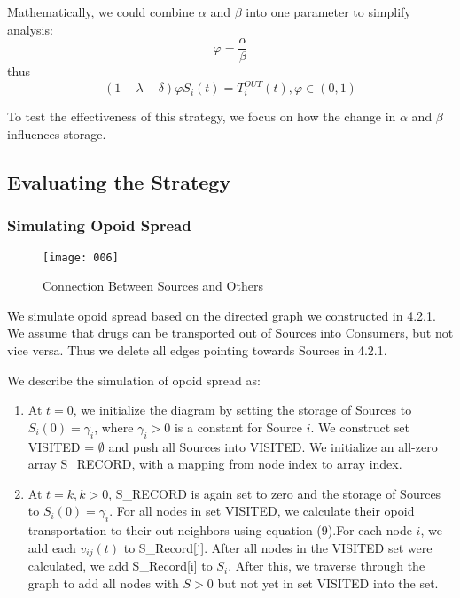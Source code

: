 Mathematically, we could combine $\alpha$ and $\beta$ into one parameter to simplify analysis:
\begin{equation}
\varphi = \frac{\alpha}{\beta}
\end{equation}
thus
\begin{equation}
 (1 - \lambda - \delta) \varphi S_i(t) = T_i^{OUT}(t), \varphi \in (0,1)
\end{equation}




To test the effectiveness of this strategy, we focus on how the change in $\alpha$ and $\beta$ influences storage.

\subsection{Evaluating the Strategy}
\subsubsection{Simulating Opoid Spread}

\begin{wrapfigure}[13]{r}{0.25\linewidth} %
	\begin{center}
		\texttt{[image: 006]}
	\end{center}
	\caption{Connection Between Sources and Others}
\end{wrapfigure}

We simulate opoid spread based on the directed graph we constructed in 4.2.1. We assume that drugs can be transported out of Sources into Consumers, but not vice versa. Thus we delete all edges pointing towards Sources in 4.2.1. 

We describe the simulation of opoid spread as:

\begin{enumerate}[(1)]
	\item At $t=0$, we initialize the diagram by setting the storage of Sources to $S_i(0)=\gamma_i$, where $\gamma_i>0$ is a constant for Source $i$. We construct set VISITED = $\emptyset$ and push all Sources into VISITED. We initialize an all-zero array S\_RECORD, with a mapping from node index to array index.
	
	\item At $t=k, k>0$, S\_RECORD is again set to zero and the storage of Sources to $S_i(0)=\gamma_i$. For all nodes in set VISITED, we calculate their opoid transportation to their out-neighbors using equation (9).For each node $i$, we add each $v_{ij}(t)$ to S\_Record[j]. After all nodes in the VISITED set were calculated, we add S\_Record[i] to $S_i$. After this, we traverse through the graph to add all nodes with $S>0$ but not yet in set VISITED into the set. 

\end{enumerate}

